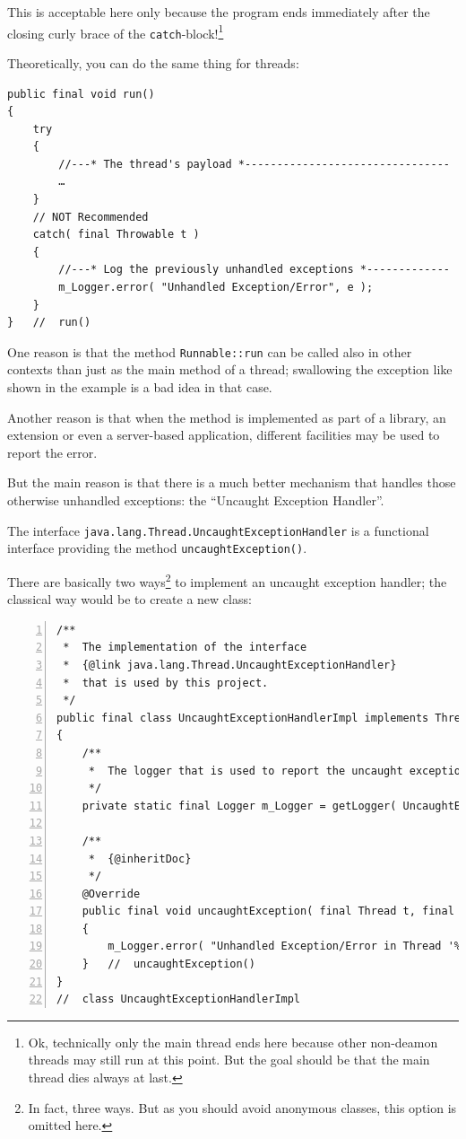 \documentclass[11pt,a4paper, titlepage, parskip=half, headsepline, footsepline, cleardoublepage=current, headheight=1cm]{scrbook}
\begin{document}
This is acceptable here only because the program ends immediately after the closing curly brace of the \lstinline|catch|-block!\footnote{Ok, technically only the main thread ends here because other non-deamon threads may still run at this point. But the goal should be that the main thread dies always at last.}

Theoretically, you can do the same thing for threads:
\begin{lstlisting}
public final void run()
{
    try
    {
        //---* The thread's payload *--------------------------------
        …
    }
    // NOT Recommended
    catch( final Throwable t )
    {
        //---* Log the previously unhandled exceptions *-------------
        m_Logger.error( "Unhandled Exception/Error", e );
    }
}   //  run()
\end{lstlisting}

One reason is that the method \lstinline|Runnable::run|\autocite{ORACLE_DOC_RUNNABLE:run} can be called also in other contexts than just as the main method of a thread; swallowing the exception like shown in the example is a bad idea in that case.

Another reason is that when the method is implemented as part of a library, an extension or even a server-based application, different facilities may be used to report the error.

But the main reason is that there is a much better mechanism that handles those otherwise unhandled exceptions: the “Uncaught Exception Handler”\autocite{ORACLE_DOC_UNCAUGHTEXCEPTIONHANDLER_INTERFACE}.

The interface \lstinline|java.lang.Thread.UncaughtExceptionHandler| is a functional interface\autocite{ORACLE_DOC_LANGUAGE_SPECIFICATION:FunctionalInterfaces, ORACLE_DOC_LANGUAGE_SPECIFICATION:FunctionalInterface, ORACLE_DOC_FUNCTIONALINTERFACE_ANNOTATION} providing the method \lstinline|uncaughtException()|\autocite{ORACLE_DOC_UNCAUGHTEXCEPTIONHANDLER:uncaughtException}.

There are basically two ways\footnote{In fact, three ways. But as you should avoid anonymous classes, this option is omitted here.} to implement an uncaught exception handler; the classical way would be to create a new class:
\begin{lstlisting}[numbers=left,caption={Class UncaughtExceptionHandlerImpl}]
/**
 *  The implementation of the interface
 *  {@link java.lang.Thread.UncaughtExceptionHandler}
 *  that is used by this project.
 */
public final class UncaughtExceptionHandlerImpl implements Thread.UncaughtExceptionHandler
{
    /**
     *  The logger that is used to report the uncaught exceptions.
     */
    private static final Logger m_Logger = getLogger( UncaughtExceptionHandlerImpl.class );
     
    /**
     *  {@inheritDoc}
     */
    @Override
    public final void uncaughtException( final Thread t, final Throwable e )
    {
        m_Logger.error( "Unhandled Exception/Error in Thread '%s'".formatted( t.getName(), e );
    }   //  uncaughtException()
}
//  class UncaughtExceptionHandlerImpl 
\end{lstlisting}
\end{document}
